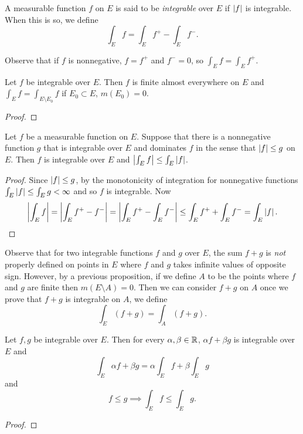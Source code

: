 \begin{definition}[Integrable]
	A measurable function $f$ on $E$ is said to be
	\emph{integrable} over $E$ if $\left\lvert f \right\rvert$ is integrable.
	When this is so, we define
	\[\int_E f = \int_E f^+ - \int_E f^-.\]
\end{definition}

Observe that if $f$ is nonnegative, $f = f^+$ and
$f^- = 0$, so $\int_E f = \int_E f^+$.

\begin{proposition}
	Let $f$ be integrable over $E$.
	Then $f$ is finite almost everywhere on $E$
	and $\int_E f = \int_{E \setminus E_0} f$
	if $E_0 \subset E$, $m(E_0) = 0$.
\end{proposition}

\begin{proof}
\end{proof}

\begin{proposition}
	Let $f$ be a measurable function on $E$.
	Suppose that there is a nonnegative function $g$ that is integrable over
	$E$ and dominates $f$ in the sense that $\left\lvert f \right\rvert \leq g$ on $E$.
	Then $f$ is integrable over $E$ and
	$\left\lvert \int_E f \right\rvert \leq \int_E \left\lvert f \right\rvert$.
\end{proposition}

\begin{proof}
	Since $\left\lvert f \right\rvert \leq g$, by the monotonicity of integration for nonnegative functions 
	$\int_E \left\lvert f \right\rvert \leq \int_E g < \infty$
	and so $f$ is integrable. 
	Now
	\[
		\left\lvert \int_E f \right\rvert 
		= \left\lvert \int_E f^+ - f^- \right\rvert
		= \left\lvert \int_E f^+ - \int_E f^- \right\rvert
		\leq \int_E f^+ + \int_E f^-
		= \int_E \left\lvert f \right\rvert.
	\]
\end{proof}

Observe that for two integrable functions $f$ and $g$ over $E$,
the sum $f + g$ is \emph{not} properly defined on points in $E$ 
where $f$ and $g$ takes infinite values 
 of opposite sign.
However, by a previous proposition, if we define $A$ to be the points 
where $f$ and $g$ are finite then $m(E \setminus A) = 0$. 
Then we can consider $f + g$ on $A$ once we prove that 
$f + g$ is integrable on $A$, we define 
\[\int_E (f + g) = \int_A (f + g).\]

\begin{theorem}
	Let $f, g$ be integrable over $E$. 
	Then for every $\alpha, \beta \in \mathbb{R}$,
	$\alpha f + \beta g$ is integrable over $E$ and 
	\[ \int_E \alpha f + \beta g 
	= \alpha \int_E f + \beta \int_E g \] 
	and
	\[f \leq g \implies \int_E f \leq \int_E g.\]
\end{theorem}

\begin{proof}
\end{proof}